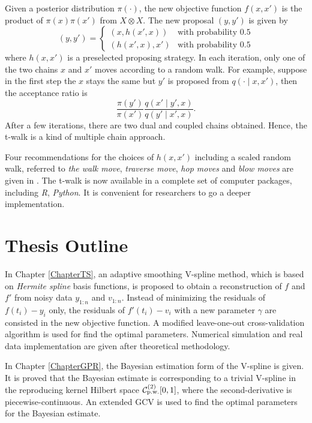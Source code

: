 Given a posterior distribution $\pi(\cdot)$, the new objective function $f(x,x')$ is the product of $\pi(x)\pi(x')$ from $X \otimes X$. The new proposal $(y,y')$ is given by
\begin{equation*} (y,y') =
\begin{cases}
\left(x,h(x',x)\right) & \mbox{with probability 0.5}\\
\left(h(x',x),x'\right) & \mbox{with probability 0.5}
\end{cases}
\end{equation*}
where $h(x,x')$ is a preselected proposing strategy. In each iteration, only one of the two chains $x$ and $x'$ moves according to a random walk. For example, suppose in the first step the $x$ stays the same but $y'$ is proposed from $q(\cdot\mid x,x')$, then the acceptance ratio is 
\begin{equation*}
\frac{\pi\left(y'\right)}{\pi\left(x'\right)}\frac{q\left(x'\mid y',x\right) }{q\left(y'\mid x',x\right)}. 
\end{equation*}
After a few iterations, there are two dual and coupled chains obtained. Hence, the t-walk is a kind of multiple chain approach. 

Four recommendations for the choices of $h\left(x,x'\right)$ including a scaled random walk, referred to \textit{the walk move}, \textit{traverse move}, \textit{hop moves} and \textit{blow moves} are given in \citep{christen2010general}. The t-walk is now available in a complete set of computer packages, including \textit{R}, \textit{Python}. It is convenient for researchers to go a deeper implementation. 



\section{Thesis Outline}

In Chapter \ref{ChapterTS}, an adaptive smoothing V-spline method, which is based on \textit{Hermite spline} basis functions, is proposed to obtain a reconstruction of $f$ and $f'$ from noisy data $y_{1:n}$ and $v_{1:n}$. Instead of minimizing the residuals of $f(t_i)-y_i$ only, the residuals of $f'(t_i)-v_i$ with a new parameter $\gamma$ are consisted in the new objective function. A modified leave-one-out cross-validation algorithm is used for find the optimal parameters. Numerical simulation and real data implementation are given after theoretical methodology. 

In Chapter \ref{ChapterGPR}, the Bayesian estimation form of the V-spline is given. It is proved that the Bayesian estimate is corresponding to a trivial V-spline  in the reproducing kernel Hilbert space $\mathcal{C}_{\mbox{\scriptsize p.w.}}^{(2)}[0,1]$, where the second-derivative is piecewise-continuous.  An extended GCV is used to find the optimal parameters for the Bayesian estimate. 

